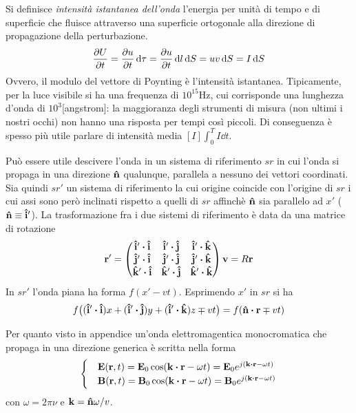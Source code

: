 Si definisce \textit{intensità istantanea dell'onda} l'energia per unità di tempo e di superficie che fluisce
attraverso una superficie ortogonale alla direzione di propagazione della perturbazione.
\[
    \pdv{U}{t}=\pdv{u}{t}\dd{\tau}=\pdv{u}{t}\dd{l}\dd{S}=uv\dd{S}=I\dd{S}
\]
Ovvero, il modulo del vettore di Poynting è l'intensità istantanea.
Tipicamente, per la luce visibile si ha una frequenza di $10^{15}$Hz, cui corrisponde una lunghezza
d'onda di $10^3$[angstrom]: la maggioranza degli strumenti di misura (non ultimi i nostri occhi)
non hanno una risposta per tempi così piccoli. Di conseguenza è spesso più utile
parlare di intensità media $[I]\int_0^TI\dd{t}$.




Può essere utile descivere l'onda in un sistema di riferimento $sr$ in cui l'onda si propaga
in una direzione $\vu{n}$ qualunque, parallela a nessuno dei
vettori coordinati. Sia quindi $sr'$ un sistema di riferimento la cui origine coincide con l'origine di
$sr$ i cui assi sono però inclinati rispetto a quelli di $sr$ affinchè $\vu{n}$
sia parallelo ad $x'$ ($\vu{n}\equiv\vu{i}'$). La trasformazione fra i due sistemi di riferimento è data da una matrice di rotazione
\[
    \vb{r}'=\left(\begin{matrix}
                 \vu{i}'\vdot\vu{i} & \vu{i}'\vdot\vu{j} & \vu{i}'\vdot\vu{k} \\
                 \vu{j}'\vdot\vu{i} & \vu{j}'\vdot\vu{j} & \vu{j}'\vdot\vu{k} \\
                 \vu{k}'\vdot\vu{i} & \vu{k}'\vdot\vu{j} & \vu{k}'\vdot\vu{k} \\
            \end{matrix}\right)\vb{v}=
            R\vb{r}
\]
In $sr'$ l'onda piana ha forma $f(x'-vt)$. Esprimendo $x'$ in $sr$ si ha
\[f\bigl((\vu{i}'\vdot\vu{i})x + (\vu{i}'\vdot\vu{j})y + (\vu{i}'\vdot\vu{k})z \mp vt\bigr)=f(\vu{n}\vdot\vb{r}\mp vt)\]



Per quanto visto in appendice un'onda elettromagentica monocromatica che propaga in una direzione generica
è scritta nella forma
\[
    \begin{cases}
        & \vb{E}(\vb{r},t)=\vb{E}_0\cos(\vb{k}\vdot\vb{r}-\omega t)=\vb{E}_0e^{j(\vb{k}\vdot\vb{r}-\omega t)}\\
        & \vb{B}(\vb{r},t)=\vb{B}_0\cos(\vb{k}\vdot\vb{r}-\omega t)=\vb{B}_0e^{j(\vb{k}\vdot\vb{r}-\omega t)}
    \end{cases}
\]
 con $\omega=2\pi\nu$ e $\vb{k}=\vu{n}\omega/v$.
